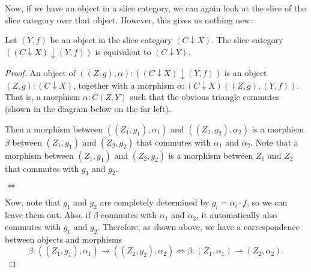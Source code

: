 Now, if we have an object in a slice category, we can again look at the slice of the slice category over that object. However, this gives us nothing new:
\begin{lemma}
  Let $ (Y, f) $ be an object in the slice category $ (C \downarrow X) $. The slice category $ ((C \downarrow X) \downarrow (Y, f)) $ is equivalent to $ (C \downarrow Y) $.
\end{lemma}
\begin{proof}
  An object of $ ((Z, g), \alpha) : ((C \downarrow X) \downarrow (Y, f)) $ is an object $ (Z, g) : (C \downarrow X) $, together with a morphism $ \alpha: (C \downarrow X)((Z, g), (Y, f)) $. That is, a morphism $ \alpha: C(Z, Y) $ such that the obvious triangle commutes (shown in the diagram below on the far left).

  Then a morphism between $ ((Z_1, g_1), \alpha_1) $ and $ ((Z_2, g_2), \alpha_2) $ is a morphism $ \beta $ between $ (Z_1, g_1) $ and $ (Z_2, g_2) $ that commutes with $ \alpha_1 $ and $ \alpha_2 $. Note that a morphism between $ (Z_1, g_1) $ and $ (Z_2, g_2) $ is a morphism between $ Z_1 $ and $ Z_2 $ that commutes with $ g_1 $ and $ g_2 $.
  \begin{center}
    $ \Leftrightarrow $
  \end{center}

  Now, note that $ g_1 $ and $ g_2 $ are completely determined by $ g_i = \alpha_i \cdot f $, so we can leave them out. Also, if $ \beta $ commutes with $ \alpha_1 $ and $ \alpha_2 $, it automatically also commutes with $ g_1 $ and $ g_2 $. Therefore, as shown above, we have a correspondence between objects and morphisms
  \[ \beta: ((Z_1, g_1), \alpha_1) \to ((Z_2, g_2), \alpha_2) \Leftrightarrow \beta: (Z_1, \alpha_1) \to (Z_2, \alpha_2). \]
\end{proof}

